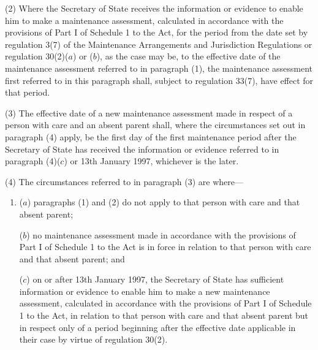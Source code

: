 \documentclass[a4paper,12pt]{article}
\begin{document}

(2) Where 
the Secretary of State  %
receives the information or evidence to enable him to make a maintenance assessment, calculated in accordance with the provisions of Part I of Schedule 1 to the Act, for the period from the date set by regulation 3(7) of the Maintenance Arrangements and Jurisdiction Regulations or regulation 30(2)($a$) or ($b$), as the case may be, to the effective date of the maintenance assessment referred to in paragraph (1), the maintenance assessment first referred to in this paragraph shall, subject to regulation 33(7), have effect for that period.

(3) The effective date of a new maintenance assessment made in respect of a person with care and an absent parent shall, where the circumstances set out in paragraph (4) apply, be the first day of the first maintenance period after the 
Secretary of State  %
has received the information or evidence referred to in paragraph (4)($c$) or 13th January 1997, whichever is the later.

(4) The circumstances referred to in paragraph (3) are where—
\begin{enumerate}\item[]
($a$) paragraphs (1) and (2) do not apply to that person with care and that absent parent;

($b$) no maintenance assessment made in accordance with the provisions of Part I of Schedule 1 to the Act is in force in relation to that person with care and that absent parent; and

($c$) on or after 13th January 1997, 
the Secretary of State  %
has sufficient information or evidence to enable him to make a new maintenance assessment, calculated in accordance with the provisions of Part I of Schedule 1 to the Act, in relation to that person with care and that absent parent but in respect only of a period beginning after the effective date applicable in their case by virtue of regulation 30(2).
\end{enumerate}
\end{document}
